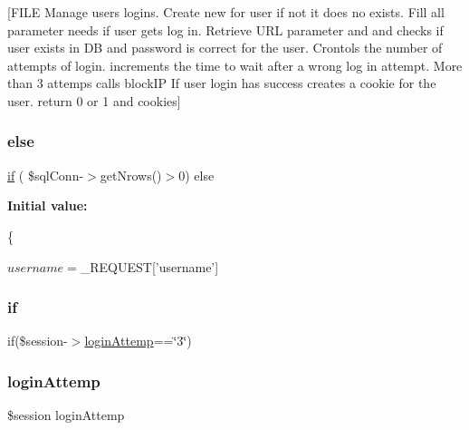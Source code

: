 \mbox{[}F\+I\+LE Manage users logins. Create new  for user if not it does no exists. Fill all  parameter needs if user gets log in. Retrieve U\+RL parameter  and  and checks if user exists in DB and password is correct for the user. Crontols the number of attempts of login.  increments the time to wait after a wrong log in attempt. More than 3 attemps calls block\+IP If user login has success creates a cookie for the user. return 0 or 1 and cookies\mbox{]} \mbox{\label{login_8php_a8fdf19f1f601d8e738a213636ddd1c0d}} 
\subsubsection{\texorpdfstring{else}{else}}
{\footnotesize\ttfamily \mbox{\hyperlink{login_8php_a1e9ad7645a82f87ff70cac2447de1c76}{if}} ( \$sql\+Conn-\/$>$get\+Nrows()$>$0) else}

{\bfseries Initial value\+:}
\begin{DoxyCode}
\{
     
        $username=$\_REQUEST[\textcolor{stringliteral}{'username'}]
\end{DoxyCode}
\mbox{\label{login_8php_a1e9ad7645a82f87ff70cac2447de1c76}} 
\subsubsection{\texorpdfstring{if}{if}}
{\footnotesize\ttfamily if(\$session-\/$>$\mbox{\hyperlink{login_8php_a66bd0a4d3f2564c19188e8257c34147d}{login\+Attemp}}==\char`\"{}3\char`\"{})}

\mbox{\label{login_8php_a66bd0a4d3f2564c19188e8257c34147d}} 
\subsubsection{\texorpdfstring{login\+Attemp}{loginAttemp}}
{\footnotesize\ttfamily \$session login\+Attemp}

